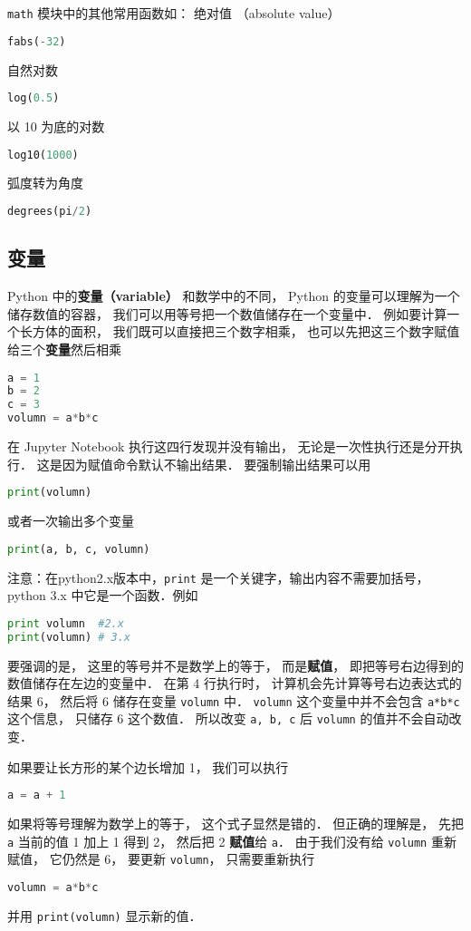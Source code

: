 \verb|math| 模块中的其他常用函数如： 绝对值 （absolute value）
\begin{lstlisting}[language=python]
fabs(-32)
\end{lstlisting}
自然对数
\begin{lstlisting}[language=python]
log(0.5)
\end{lstlisting}
以 10 为底的对数
\begin{lstlisting}[language=python]
log10(1000)
\end{lstlisting}
弧度转为角度
\begin{lstlisting}[language=python]
degrees(pi/2)
\end{lstlisting}

\subsection{变量}
Python 中的\textbf{变量（variable）} 和数学中的不同， Python 的变量可以理解为一个储存数值的容器， 我们可以用等号把一个数值储存在一个变量中． 例如要计算一个长方体的面积， 我们既可以直接把三个数字相乘， 也可以先把这三个数字赋值给三个\textbf{变量}然后相乘
\begin{lstlisting}[language=python]
a = 1
b = 2
c = 3
volumn = a*b*c
\end{lstlisting}
在 Jupyter Notebook 执行这四行发现并没有输出， 无论是一次性执行还是分开执行． 这是因为赋值命令默认不输出结果． 要强制输出结果可以用
\begin{lstlisting}[language=python]
print(volumn)
\end{lstlisting}
或者一次输出多个变量
\begin{lstlisting}[language=python]
print(a, b, c, volumn)
\end{lstlisting}
注意：在python2.x版本中，\verb|print| 是一个关键字，输出内容不需要加括号， python 3.x 中它是一个函数．例如
\begin{lstlisting}[language=python]
print volumn  #2.x
print(volumn) # 3.x
\end{lstlisting}
要强调的是， 这里的等号并不是数学上的等于， 而是\textbf{赋值}， 即把等号右边得到的数值储存在左边的变量中． 在第 4 行执行时， 计算机会先计算等号右边表达式的结果 6， 然后将 6 储存在变量 \verb|volumn| 中． \verb|volumn| 这个变量中并不会包含 \verb|a*b*c| 这个信息， 只储存 6 这个数值． 所以改变 \verb|a, b, c| 后 \verb|volumn| 的值并不会自动改变．

如果要让长方形的某个边长增加 1， 我们可以执行
\begin{lstlisting}[language=python]
a = a + 1
\end{lstlisting}
如果将等号理解为数学上的等于， 这个式子显然是错的． 但正确的理解是， 先把 \verb|a| 当前的值 1 加上 1 得到 2， 然后把 2 \textbf{赋值}给 \verb|a|． 由于我们没有给 \verb|volumn| 重新赋值， 它仍然是 6， 要更新 \verb|volumn|， 只需要重新执行
\begin{lstlisting}[language=python]
volumn = a*b*c
\end{lstlisting}
并用 \verb|print(volumn)| 显示新的值．

